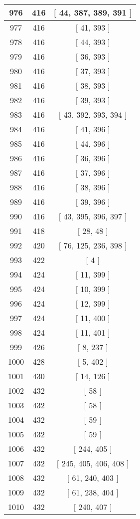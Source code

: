 \begin{center}
\begin{longtable}[H]{|| c c c ||}
976 & 416 & [ 44, 387, 389, 391 ] \\ 
\hline
977 & 416 & [ 41, 393 ] \\ 
\hline
978 & 416 & [ 44, 393 ] \\ 
\hline
979 & 416 & [ 36, 393 ] \\ 
\hline
980 & 416 & [ 37, 393 ] \\ 
\hline
981 & 416 & [ 38, 393 ] \\ 
\hline
982 & 416 & [ 39, 393 ] \\ 
\hline
983 & 416 & [ 43, 392, 393, 394 ] \\ 
\hline
984 & 416 & [ 41, 396 ] \\ 
\hline
985 & 416 & [ 44, 396 ] \\ 
\hline
986 & 416 & [ 36, 396 ] \\ 
\hline
987 & 416 & [ 37, 396 ] \\ 
\hline
988 & 416 & [ 38, 396 ] \\ 
\hline
989 & 416 & [ 39, 396 ] \\ 
\hline
990 & 416 & [ 43, 395, 396, 397 ] \\ 
\hline
991 & 418 & [ 28, 48 ] \\ 
\hline
992 & 420 & [ 76, 125, 236, 398 ] \\ 
\hline
993 & 422 & [ 4 ] \\ 
\hline
994 & 424 & [ 11, 399 ] \\ 
\hline
995 & 424 & [ 10, 399 ] \\ 
\hline
996 & 424 & [ 12, 399 ] \\ 
\hline
997 & 424 & [ 11, 400 ] \\ 
\hline
998 & 424 & [ 11, 401 ] \\ 
\hline
999 & 426 & [ 8, 237 ] \\ 
\hline
1000 & 428 & [ 5, 402 ] \\ 
\hline
1001 & 430 & [ 14, 126 ] \\ 
\hline
1002 & 432 & [ 58 ] \\ 
\hline
1003 & 432 & [ 58 ] \\ 
\hline
1004 & 432 & [ 59 ] \\ 
\hline
1005 & 432 & [ 59 ] \\ 
\hline
1006 & 432 & [ 244, 405 ] \\ 
\hline
1007 & 432 & [ 245, 405, 406, 408 ] \\ 
\hline
1008 & 432 & [ 61, 240, 403 ] \\ 
\hline
1009 & 432 & [ 61, 238, 404 ] \\ 
\hline
1010 & 432 & [ 240, 407 ] \\ 

\end{longtable}
\end{center}
